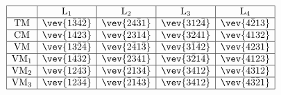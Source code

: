 \documentclass[12pt]{article}
\def\rL{{\rm L}}
\let\bm\relax
\newcommand{\bm}[1]{{\boldsymbol{#1}}}
\begin{document}
\begin{table}[H]
\setlength\extrarowheight{2pt}
$$
\begin{array}{|c|c|c|c|c|c|c|} 
\hline
 &  {\bm {{\bm {\rL}}}}_1  & {\bm {{\bm {\rL}}}}_2  & {\bm {{\bm {\rL}}}}_3  &  {\bm {{\bm {\rL}}}}_4   \\  \hline
{\rm TM} & \vev{1\bar3\bar4\bar2} & \vev{24\bar31} & \vev{312\bar4} & \vev{4\bar213}
\\ \hline
{\rm CM} & \vev{1\bar42\bar3} & \vev{23\bar1\bar4} &  \vev{3\bar2\bar41} & \vev{4132} 
\\ \hline
{\rm VM} & \vev{13\bar2\bar4}& \vev{2\bar41\bar3} & \vev{3\bar1\bar42} & \vev{4231} 
\\ \hline
{\rm VM}{}_1 &  \vev{1\bar4\bar32} &  \vev{\bar2\bar3\bar41} &   \vev{3\bar21\bar4} &  \vev{4123} 
\\ \hline
{\rm VM}{}_2 &  \vev{12\bar4\bar3} &   \vev{\bar213\bar4} &  \vev{3412} &  \vev{4\bar31\bar2} 
\\ \hline
{\rm VM}{}_3 &  
\vev{12\bar3\bar4} &  \vev{\bar21\bar43} & \vev{3412} &  \vev{4\bar3\bar21}
\\ \hline
    \end{array}
$$
\caption{Weighted Ordered Permutation Element Decomposition of L-matrices}
\label{t:0braneZ}
\end{table} 
\noindent
\end{document}
